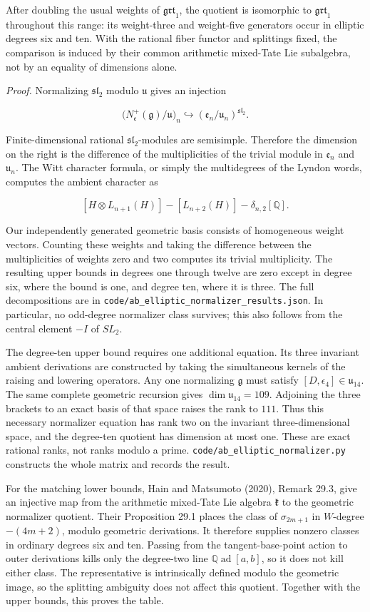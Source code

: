 \documentclass[10pt,a4paper]{article}
\begin{document}
After doubling the usual weights of \(\mathfrak{grt}_1\), the quotient is isomorphic to \(\mathfrak{grt}_1\) throughout this range: its weight-three and weight-five generators occur in elliptic degrees six and ten. With the rational fiber functor and splittings fixed, the comparison is induced by their common arithmetic mixed-Tate Lie subalgebra, not by an equality of dimensions alone.

\emph{Proof.} Normalizing \(\mathfrak{sl}_2\) modulo \(\mathfrak u\) gives an injection

\[
 \bigl(N^+_{\mathfrak e}(\mathfrak g)/\mathfrak u\bigr)_n
 \hookrightarrow(\mathfrak e_n/\mathfrak u_n)^{\mathfrak{sl}_2}.
\]

Finite-dimensional rational \(\mathfrak{sl}_2\)-modules are semisimple. Therefore the dimension on the right is the difference of the multiplicities of the trivial module in \(\mathfrak e_n\) and \(\mathfrak u_n\). The Witt character formula, or simply the multidegrees of the Lyndon words, computes the ambient character as

\[
 [H\otimes L_{n+1}(H)]-[L_{n+2}(H)]-\delta_{n,2}[\mathbb Q].
\]

Our independently generated geometric basis consists of homogeneous weight vectors. Counting these weights and taking the difference between the multiplicities of weights zero and two computes its trivial multiplicity. The resulting upper bounds in degrees one through twelve are zero except in degree six, where the bound is one, and degree ten, where it is three. The full decompositions are in \texttt{code/ab\_elliptic\_normalizer\_results.json}. In particular, no odd-degree normalizer class survives; this also follows from the central element \(-I\) of \(SL_2\).

The degree-ten upper bound requires one additional equation. Its three invariant ambient derivations are constructed by taking the simultaneous kernels of the raising and lowering operators. Any one normalizing \(\mathfrak g\) must satisfy \([D,\epsilon_4]\in\mathfrak u_{14}\). The same complete geometric recursion gives \(\dim\mathfrak u_{14}=109\). Adjoining the three brackets to an exact basis of that space raises the rank to \(111\). Thus this necessary normalizer equation has rank two on the invariant three-dimensional space, and the degree-ten quotient has dimension at most one. These are exact rational ranks, not ranks modulo a prime. \texttt{code/ab\_elliptic\_normalizer.py} constructs the whole matrix and records the result.

For the matching lower bounds, Hain and Matsumoto (2020), Remark 29.3, give an injective map from the arithmetic mixed-Tate Lie algebra \(\mathfrak k\) to the geometric normalizer quotient. Their Proposition 29.1 places the class of \(\sigma_{2m+1}\) in \(W\)-degree \(-(4m+2)\), modulo geometric derivations. It therefore supplies nonzero classes in ordinary degrees six and ten. Passing from the tangent-base-point action to outer derivations kills only the degree-two line \(\mathbb Q\operatorname{ad}[a,b]\), so it does not kill either class. The representative is intrinsically defined modulo the geometric image, so the splitting ambiguity does not affect this quotient. Together with the upper bounds, this proves the table.
\end{document}
